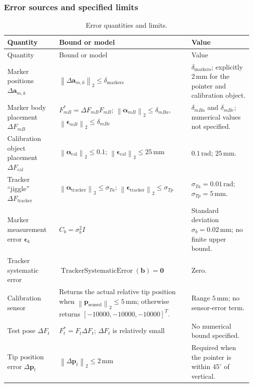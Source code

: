 \documentclass[11pt]{article}
\newcommand{\vct}[1]{\bm{#1}}
\newcommand{\Fun}[1]{\operatorname{#1}}
\newcommand{\norm}[1]{\left\|#1\right\|_2}
\begin{document}
\subsubsection{Error sources and specified limits}
\begingroup\small
\begin{longtable}{p{}p{}p{}}
\caption{Error quantities and limits.}\label{tab:errorlimits}\\
\toprule
Quantity & Bound or model & Value \\\midrule
\endfirsthead
\toprule Quantity & Bound or model & Value \\\midrule
\endhead
Marker positions $\Delta\vct{a}_{m,k}$ & $\norm{\Delta\vct{a}_{m,k}}\leq\delta_{\mathrm{markers}}$ & $\delta_{\mathrm{markers}}$; explicitly $2\,\mathrm{mm}$ for the pointer and calibration object. \\\midrule
Marker body placement $\Delta F_{mB}$ & $F_{mB}^*=\Delta F_{mB}F_{mB}$; $\norm{\vct{\alpha}_{mB}}\leq\delta_{mBa}$, $\norm{\vct{\epsilon}_{mB}}\leq\delta_{mBe}$ & $\delta_{mBa}$ and $\delta_{mBe}$; numerical values not specified. \\\midrule
Calibration object placement $\Delta F_{\mathrm{cal}}$ & $\norm{\vct{\alpha}_{\mathrm{cal}}}\leq0.1$; $\norm{\vct{\epsilon}_{\mathrm{cal}}}\leq25\,\mathrm{mm}$ & $0.1\,\mathrm{rad}$; $25\,\mathrm{mm}$. \\\midrule
Tracker ``jiggle'' $\Delta F_{\mathrm{tracker}}$ & $\norm{\vct{\alpha}_{\mathrm{tracker}}}\leq\sigma_{Ta}$; $\norm{\vct{\epsilon}_{\mathrm{tracker}}}\leq\sigma_{Tp}$ & $\sigma_{Ta}=0.01\,\mathrm{rad}$; $\sigma_{Tp}=5\,\mathrm{mm}$. \\\midrule
Marker measurement error $\vct{\epsilon}_b$ & $C_b=\sigma_b^2I$ & Standard deviation $\sigma_b=0.02\,\mathrm{mm}$; no finite upper bound. \\\midrule
Tracker systematic error & $\Fun{TrackerSystematicError}(\vct{b})=\vct{0}$ & Zero. \\\midrule
Calibration sensor & Returns the actual relative tip position when $\norm{\vct{p}_{\mathrm{sensed}}}\leq5\,\mathrm{mm}$; otherwise returns $[-10000,-10000,-10000]^T$. & Range $5\,\mathrm{mm}$; no sensor-error term. \\\midrule
Test pose $\Delta F_t$ & $F_t^*=F_t\Delta F_t$; $\Delta F_t$ is relatively small & No numerical bound specified. \\\midrule
Tip position error $\Delta\vct{p}_t$ & $\norm{\Delta\vct{p}_t}\leq2\,\mathrm{mm}$ & Required when the pointer is within $45^\circ$ of vertical. \\
\bottomrule
\end{longtable}
\endgroup
\end{document}
